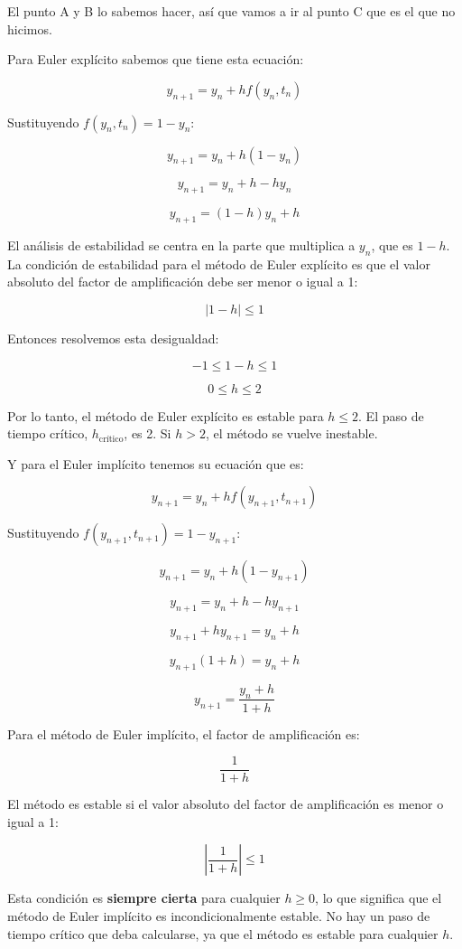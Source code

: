 
El punto A y B lo sabemos hacer, así que vamos a ir al punto C que es el que no hicimos. 


Para Euler explícito sabemos que tiene esta ecuación:

\[
y_{n+1} = y_n + h f(y_n, t_n)
\]

Sustituyendo \( f(y_n, t_n) = 1 - y_n \):

\[
y_{n+1} = y_n + h (1 - y_n)
\]

\[
y_{n+1} = y_n + h - h y_n
\]

\[
y_{n+1} = (1 - h) y_n + h
\]

El análisis de estabilidad se centra en la parte que multiplica a \( y_n \), que es \( 1 - h \). La condición de estabilidad para el método de Euler explícito es que el valor absoluto del factor de amplificación debe ser menor o igual a 1:

\[
|1 - h| \leq 1
\]

Entonces resolvemos esta desigualdad:

\[
-1 \leq 1 - h \leq 1
\]

\[
0 \leq h \leq 2
\]

Por lo tanto, el método de Euler explícito es estable para \( h \leq 2 \). El paso de tiempo crítico, \( h_{\text{crítico}} \), es 2. Si \( h > 2 \), el método se vuelve inestable.

Y para el Euler implícito tenemos su ecuación que es:

\[
y_{n+1} = y_n + h f(y_{n+1}, t_{n+1})
\]

Sustituyendo \( f(y_{n+1}, t_{n+1}) = 1 - y_{n+1} \):

\[
y_{n+1} = y_n + h (1 - y_{n+1})
\]

\[
y_{n+1} = y_n + h - h y_{n+1}
\]

\[
y_{n+1} + h y_{n+1} = y_n + h
\]

\[
y_{n+1} (1 + h) = y_n + h
\]

\[
y_{n+1} = \frac{y_n + h}{1 + h}
\]

Para el método de Euler implícito, el factor de amplificación es:

\[
\frac{1}{1 + h}
\]

El método es estable si el valor absoluto del factor de amplificación es menor o igual a 1:

\[
\left|\frac{1}{1 + h}\right| \leq 1
\]

Esta condición es \textbf{siempre cierta} para cualquier \( h \geq 0 \), lo que significa que el método de Euler implícito es incondicionalmente estable. No hay un paso de tiempo crítico que deba calcularse, ya que el método es estable para cualquier \( h \).




